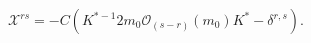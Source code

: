 \begin{equation*}
\mathcal{X}^{rs}=-C(K^{\ast -1}2m_{0}\mathcal{O}_{(s-r)}(m_{0})K^{\ast
}-\delta ^{r,s}).
\end{equation*}

